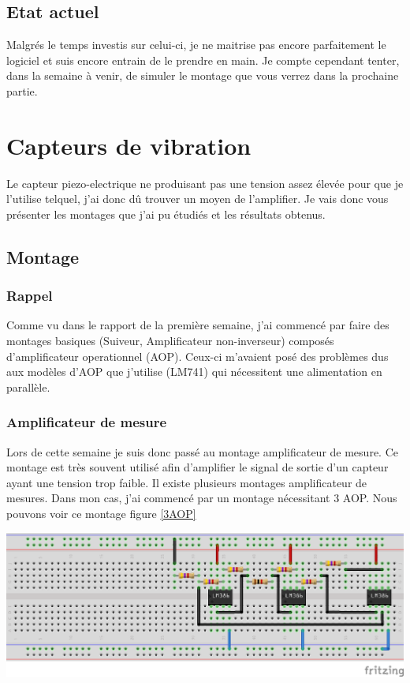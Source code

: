 \documentclass[11pt,french,a4paper]{article}
\begin{document}
\subsection{Etat actuel}
Malgrés le temps investis sur celui-ci, je ne maitrise pas encore parfaitement le logiciel et suis encore entrain de le prendre en main. Je compte cependant tenter, dans la semaine à venir, de simuler le montage que vous verrez dans la prochaine partie. 
\newpage
\section{Capteurs de vibration}
Le capteur piezo-electrique ne produisant pas une tension assez élevée pour que je l’utilise telquel, j’ai donc dû trouver un moyen de l’amplifier. Je vais donc vous présenter les montages que j’ai pu étudiés et les résultats obtenus.

\subsection{Montage}
\subsubsection{Rappel}

Comme vu dans le rapport de la première semaine, j’ai commencé par faire des montages basiques (Suiveur, Amplificateur non-inverseur) composés d’amplificateur operationnel (AOP). Ceux-ci m’avaient posé des problèmes dus aux modèles d’AOP que j’utilise (LM741) qui nécessitent une alimentation en parallèle.

\subsubsection{Amplificateur de mesure}

Lors de cette semaine je suis donc passé au montage amplificateur de mesure. Ce montage est très souvent utilisé afin d’amplifier le signal de sortie d’un capteur ayant une tension trop faible.
Il existe plusieurs montages amplificateur de mesures. Dans mon cas, j’ai commencé par un montage nécessitant 3 AOP. Nous pouvons voir ce montage figure \ref{3AOP}

\begin{center}	
\includegraphics[scale=1]{../img/instrumentation3aop_bb.png}
\label{3AOP}
\end{center}
\end{document}
